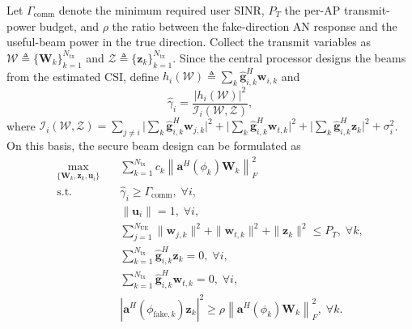 \documentclass[letterpaper,journal]{IEEEtran}
\begin{document}
Let $\Gamma_{\mathrm{comm}}$ denote the minimum required user SINR, $P_T$ the per-AP transmit-power budget, and $\rho$ the ratio between the fake-direction AN response and the useful-beam power in the true direction. Collect the transmit variables as $\mathcal{W}\triangleq\{\mathbf{W}_k\}_{k=1}^{N_{\mathrm{tx}}}$ and $\mathcal{Z}\triangleq\{\mathbf{z}_k\}_{k=1}^{N_{\mathrm{tx}}}$. Since the central processor designs the beams from the estimated CSI, define $h_i(\mathcal W)\triangleq\sum_k\widehat{\mathbf g}_{i,k}^H\mathbf w_{i,k}$ and
\begin{equation}
\widehat{\gamma}_i=\frac{|h_i(\mathcal W)|^2}{\mathcal{I}_i(\mathcal{W},\mathcal{Z})},
\label{eq:sinr-nominal}
\end{equation}
where $\mathcal{I}_i(\mathcal{W},\mathcal{Z})={\textstyle\sum_{j\neq i}}\big|{\textstyle\sum_k}\widehat{\mathbf{g}}_{i,k}^H\mathbf{w}_{j,k}\big|^2+\big|{\textstyle\sum_k}\widehat{\mathbf{g}}_{i,k}^H\mathbf{w}_{t,k}\big|^2+\big|{\textstyle\sum_k}\widehat{\mathbf{g}}_{i,k}^H\mathbf{z}_k\big|^2+\sigma_i^2$. On this basis, the secure beam design can be formulated as
\begin{subequations}
\begin{align}
\max_{\{\mathbf{W}_k,\mathbf{z}_k,\mathbf{u}_i\}} \quad & \sum_{k=1}^{N_{\mathrm{tx}}}c_k\left\|\mathbf{a}^H(\phi_k)\mathbf{W}_k\right\|_F^2 \label{prob:obj}\\
\text{s.t.}\quad & \widehat{\gamma}_i\ge \Gamma_{\mathrm{comm}},\;\forall i, \label{prob:sinr}\\
& \|\mathbf{u}_i\|=1,\;\forall i, \label{prob:unit-norm}\\
& \textstyle\sum_{j=1}^{N_{\mathrm{UE}}}\|\mathbf{w}_{j,k}\|^2+\|\mathbf{w}_{t,k}\|^2+\|\mathbf{z}_k\|^2\le P_T,\;\forall k, \label{prob:power}\\
& \textstyle\sum_{k=1}^{N_{\mathrm{tx}}}\widehat{\mathbf{g}}_{i,k}^H\mathbf{z}_k=0,\;\forall i, \label{prob:null}\\
& \textstyle\sum_{k=1}^{N_{\mathrm{tx}}}\widehat{\mathbf{g}}_{i,k}^H\mathbf{w}_{t,k}=0,\;\forall i, \label{prob:null-t}\\
& \left|\mathbf{a}^H(\phi_{\mathrm{fake},k})\mathbf{z}_k\right|^2 \ge \rho\left\|\mathbf{a}^H(\phi_k)\mathbf{W}_k\right\|_F^2,\;\forall k. \label{prob:fake}
\end{align}
\end{subequations}
\end{document}
